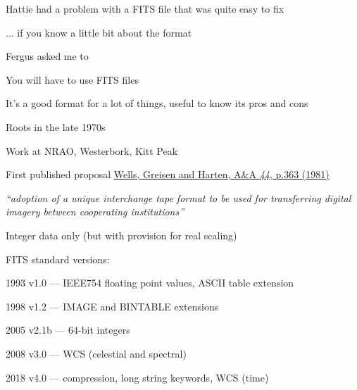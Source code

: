 \documentclass[20pt,landscape]{foils}
\newcommand{\bhref}[2]{\href{#1}{{\color{blue}#2}}}
\begin{document}

\begin{list1}
  \item Hattie had a problem with a FITS file that was quite easy to fix
  \begin{list2big}
    \item[] ... if you know a little bit about the format
  \end{list2big}
  \item Fergus asked me to
  \item You will have to use FITS files
  \item It's a good format for a lot of things,
        useful to know its pros and cons
\end{list1}



\begin{list1}
  \item Roots in the late 1970s
  \begin{list2big}
    \item Work at NRAO, Westerbork, Kitt Peak
  \end{list2big}
  \item First published proposal
        \bhref{https://ui.adsabs.harvard.edu/abs/1981A&AS...44..363W}
              {Wells, Greisen and Harten, A{\&}A {\sl 44}, p.363 (1981)}
  \begin{list2big}
    \item {\sl
           ``adoption of a unique interchange tape format to be used for
             transferring digital imagery between cooperating institutions''}
    \item Integer data only (but with provision for real scaling)
  \end{list2big}
  \item FITS standard versions:
  \begin{list2big}
     \item[1993] v1.0 --- IEEE754 floating point values, ASCII table extension
     \item[1998] v1.2 --- IMAGE and BINTABLE extensions
     \item[2005] v2.1b --- 64-bit integers
     \item[2008] v3.0 --- WCS (celestial and spectral)
     \item[2018] v4.0 --- compression, long string keywords, WCS (time)
  \end{list2big}
\end{list1}
\end{document}
